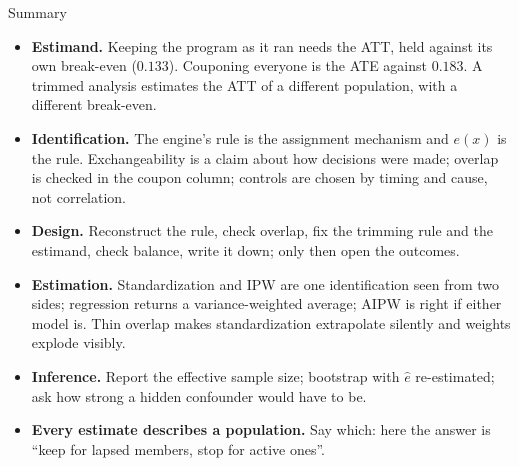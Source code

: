 \documentclass[aspectratio=169, 11pt, handout]{beamer}
\newcommand{\spinestep}[1]{\textcolor{sbgreen}{\textbf{#1}}}
\begin{document}
\begin{frame}{Summary}

\begin{itemize}
  \item \spinestep{Estimand.} Keeping the program as it ran needs the ATT, held against its own break-even ($0.133$). Couponing everyone is the ATE against $0.183$. A trimmed analysis estimates the ATT of a different population, with a different break-even.
  \item \spinestep{Identification.} The engine's rule is the assignment mechanism and $e(x)$ is the rule. Exchangeability is a claim about how decisions were made; overlap is checked in the coupon column; controls are chosen by timing and cause, not correlation.
  \item \spinestep{Design.} Reconstruct the rule, check overlap, fix the trimming rule and the estimand, check balance, write it down; only then open the outcomes.
  \item \spinestep{Estimation.} Standardization and IPW are one identification seen from two sides; regression returns a variance-weighted average; AIPW is right if either model is. Thin overlap makes standardization extrapolate silently and weights explode visibly.
  \item \spinestep{Inference.} Report the effective sample size; bootstrap with $\hat e$ re-estimated; ask how strong a hidden confounder would have to be.
  \item \textbf{Every estimate describes a population.} Say which: here the answer is ``keep for lapsed members, stop for active ones''.
\end{itemize}
\end{frame}
\end{document}
